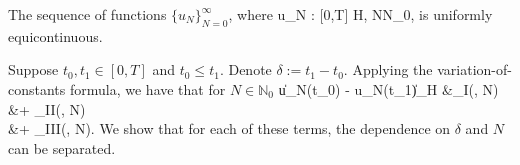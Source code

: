 \bt\label{thm:equicontinuous}
The sequence of functions \(\{u_N\}_{N=0}^\infty\), where 
\be
    u_N : [0,T] \mapsto \mathcal H, \qquad N\in\mathbb N_0,
\ee 
is uniformly equicontinuous. 
\et

\bp
Suppose \(t_0,t_1\in [0,T]\) and \(t_0 \leq t_1\). Denote \(\delta := t_1 - t_0\). Applying the variation-of-constants formula, we have that for \(N\in\mathbb N_0\)
\bea
    \|u_N(t_0) - u_N(t_1)\|_{\mathcal H} &\leq {}_{\RN1(\delta, N)}  \\
    &+ _{\RN2(\delta, N)} \\
    &+ _{\RN3(\delta, N)}.
\eea
We show that for each of these terms, the dependence on \(\delta\) and \(N\) can be separated. %
